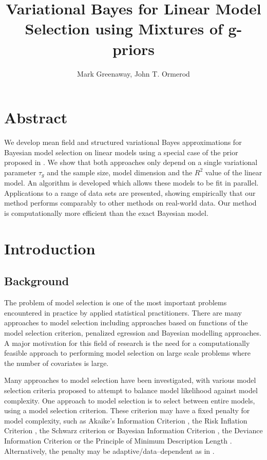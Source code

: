 \documentclass{amsart}[12pt]
\title{Variational Bayes for Linear Model Selection using Mixtures of g-priors}
\author{Mark Greenaway, John T. Ormerod}
\begin{document}
\maketitle

\section*{Abstract}


We develop mean field and structured variational Bayes approximations for Bayesian model selection on linear
models using a special case of the prior proposed in \cite{Maruyama2011}. We show that both approaches only
depend on a single variational parameter $\tau_g$ and the sample size, model dimension and the $R^2$ value of
the linear model. An algorithm is developed which allows these models to be fit in parallel. Applications to a
range of data sets are presented, showing  empirically that our method performs comparably to other methods on
real-world data. Our method is computationally more efficient  than the exact Bayesian model.

\section{Introduction}

\subsection{Background}


The problem of model selection is one of the most important problems encountered in practice by applied
statistical practitioners. There are many approaches to model selection including approaches based on
functions of the model selection criterion, penalized egression and Bayesian modelling approaches. A major
motivation for this field of research is the need for a computationally feasible approach to performing model
selection on large scale problems where the number of covariates is large.


Many approaches to model selection have been investigated, with various model selection criteria
proposed to attempt to balance model likelihood against model complexity. One approach to model selection is
to select between entire models, using a model selection criterion. These criterion may have a fixed penalty
for model complexity, such as Akaike's Information Criterion \citep{Akaike1974}, the Risk Inflation Criterion
\citep{Foster1994}, the Schwarz criterion or Bayesian Information Criterion \citep{Schwarz1978}, the Deviance
Information Criterion \citep{Spiegelhalter2016} or the Principle of Minimum Description Length
\citep{Hansen2001}. Alternatively, the penalty may be adaptive/data--dependent as in \citep{George2000}.
\end{document}
